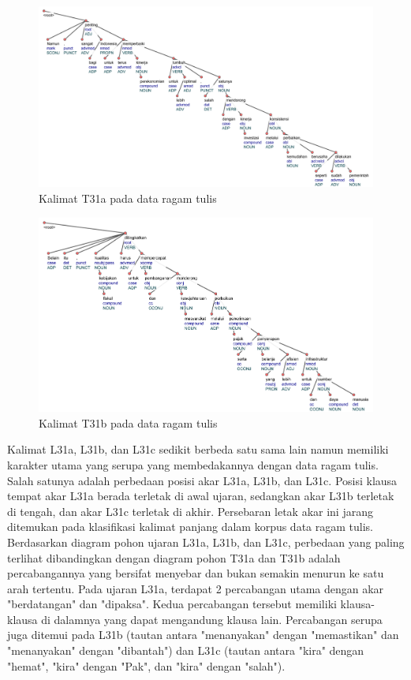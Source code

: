 \begin{figure}
	\centering \includegraphics[width=1
	\textwidth] {pics/ts2079.jpg} 
	\caption{Kalimat T31a pada data ragam tulis} 
	\label{fig:ts2079} 
\end{figure}

\begin{figure}
	\centering \includegraphics[width=1
	\textwidth] {pics/ts2081.jpg} 
	\caption{Kalimat T31b pada data ragam tulis} 
	\label{fig:ts2081} 
\end{figure}

Kalimat L31a, L31b, dan L31c sedikit berbeda satu sama lain namun memiliki karakter utama yang serupa yang membedakannya dengan data ragam tulis. Salah satunya adalah perbedaan posisi akar L31a, L31b, dan L31c. Posisi klausa tempat akar L31a berada  terletak di awal ujaran, sedangkan akar L31b terletak di tengah, dan akar L31c terletak di akhir. Persebaran letak akar ini jarang ditemukan pada klasifikasi kalimat panjang dalam korpus data ragam tulis. Berdasarkan diagram pohon ujaran L31a, L31b, dan L31c, perbedaan yang paling terlihat dibandingkan dengan diagram pohon T31a dan T31b adalah percabangannya yang bersifat menyebar dan bukan semakin menurun ke satu arah tertentu. Pada ujaran L31a, terdapat 2 percabangan utama dengan akar "berdatangan" dan "dipaksa". Kedua percabangan tersebut memiliki klausa-klausa di dalamnya yang dapat mengandung klausa lain. Percabangan serupa juga ditemui pada L31b (tautan antara "menanyakan" dengan "memastikan" dan "menanyakan" dengan "dibantah") dan L31c (tautan antara "kira" dengan "hemat", "kira" dengan "Pak", dan "kira" dengan "salah"). 

